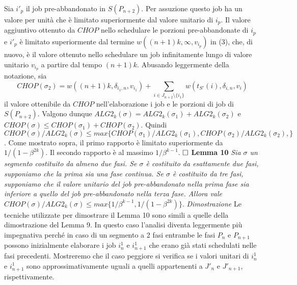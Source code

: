 \documentclass[12pt]{article}
\begin{document}
Sia $i'_{p}$ il job pre-abbandonato in $S(P_{n+2})$. Per assuzione questo job ha un valore per unità che è limitato superiormente dal valore unitario di $i_{p}$. Il valore aggiuntivo ottenuto da $CHOP$ nello schedulare le porzioni pre-abbandonate di $i_{p}$ e $i'_{p}$ è limitato superiormente dal termine $w ((n + 1) k, \infty, v_{i_{p}})$ in (3), che, di nuovo, è il valore ottenuto nello schedulare un job infinitamente lungo di valore unitario $v_{i_{p}}$ a partire dal tempo $(n + 1) k$. Abusando leggermente della notazione, sia
$$CHOP(\sigma_{2}) = w ((n + 1) k, \delta_{i_{1}, n}, v_{i_{1}}) + \sum_{i \in J_{n+2} \setminus \{i_{1}\}} w (t_{S'}(i), \delta_{i, n}, v_{i})$$ 
il valore ottenibile da $CHOP$ nell'elaborazione i job e le porzioni di job di $S(P_{n+2})$. Valgono dunque $ALG2_{k} (\sigma) = ALG2_{k} (\sigma_{1}) + ALG2_{k} (\sigma_{2})$ e $CHOP(\sigma) \leq CHOP (\sigma_{1}) + CHOP (\sigma_{2})$. Quindi $CHOP (\sigma) / ALG2_{k} (\sigma) \leq max \{CHOP(\sigma_{1}) / ALG2_{k}(\sigma_{1}), CHOP(\sigma_{2}) / ALG2_{k}(\sigma_{2}),\}$. Come mostrato sopra, il primo rapporto è limitato superiormente da $1 / (1 - \beta^{2k})$. Il secondo rapporto è al massimo $1 / \beta^{k - 1}$. $\hfill \square$
\newline \newline
\textbf{Lemma 10}
\textit{Sia $\sigma$ un segmento costituito da almeno due fasi. Se $\sigma$ è costituito da esattamente due fasi, supponiamo che la prima sia una fase continua. Se $\sigma$ è costituito da tre fasi, supponiamo che il valore unitario del job pre-abbandonato nella prima fase sia inferiore a quello del job pre-abbandonato nella terza fase. Allora vale $CHOP(\sigma) / ALG2_{k}(\sigma) \leq max \{1 / \beta^{k-1}, 1 / (1 - \beta^{2k})\}.$}
\newline \newline
\textit{Dimostrazione}
Le tecniche utilizzate per dimostrare il Lemma 10 sono simili a quelle della dimostrazione del Lemma 9. In questo caso l'analisi diventa leggermente più impegnativa perché in caso di un segmento a 2 fasi entrambe le fasi $P_{n}$ e $P_{n + 1}$ possono inizialmente elaborare i job $i_{n}^{1}$ e $i_{n+1}^{1}$ che erano già stati schedulati nelle fasi precedenti. Mostreremo che il caso peggiore si verifica se i valori unitari di $i_{n}^{1}$ e $i_{n+1}^{1}$ sono approssimativamente uguali a quelli appartenenti a $J'_{n}$ e $J'_{n+1}$, rispettivamente. 
\end{document}
